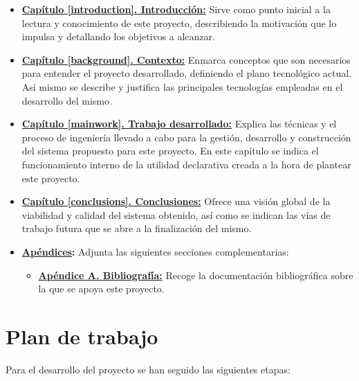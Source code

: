 \begin{itemize}
	\item \textbf{\hyperlink{introduccion}{Capítulo \ref*{introduction}. Introducción:}} Sirve como punto inicial a la lectura y conocimiento de este proyecto, describiendo la motivación que lo impulsa y detallando los objetivos a alcanzar.
	\item \textbf{\hyperlink{background}{Capítulo \ref*{background}. Contexto:}} Enmarca conceptos que son necesarios para entender el proyecto desarrollado, definiendo el plano tecnológico actual. Así mismo se describe y justifica las principales tecnologías empleadas en el desarrollo del mismo.
	\item \textbf{\hyperlink{mainwork}{Capítulo \ref*{mainwork}. Trabajo desarrollado:}} Explica las técnicas y el proceso de ingeniería llevado a cabo para la gestión, desarrollo y construcción del sistema propuesto para este proyecto. En este capítulo se indica el funcionamiento interno de la utilidad declarativa creada a la hora de plantear este proyecto.
	\item \textbf{\hyperlink{conclusions}{Capítulo \ref*{conclusions}. Conclusiones:}} Ofrece una visión global de la viabilidad y calidad del sistema obtenido, así como se indican las vías de trabajo futura que se abre a la finalización del mismo.
	\item \textbf{\hyperlink{appendices}{Apéndices}:} Adjunta las siguientes secciones complementarias:
	\begin{itemize}
		\item \textbf{\hyperlink{bibliography}{Apéndice A. Bibliografía:}} Recoge la documentación bibliográfica sobre la que se apoya este proyecto.
	\end{itemize}
\end{itemize}

\section{Plan de trabajo}

Para el desarrollo del proyecto se han seguido las siguientes etapas:

